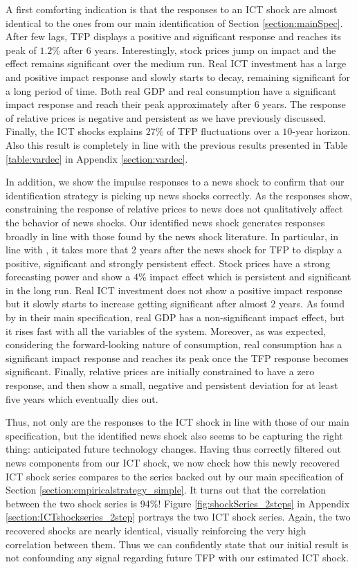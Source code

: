 \documentclass[12pt]{article}
\begin{document}
A first comforting indication is that the responses to an ICT shock are almost identical to the ones from our main identification of Section \ref{section:mainSpec}. After few lags, TFP displays a positive and significant response and reaches its peak of $1.2$\% after $6$ years. Interestingly, stock prices jump on impact and the effect remains significant over the medium run. Real ICT investment has a large and positive impact response and slowly starts to decay, remaining significant for a long period of time. Both real GDP and real consumption have a significant impact response and reach their peak approximately after $6$ years. The response of relative prices is negative and persistent as we have previously discussed. Finally, the ICT shocks explains $27$\% of TFP fluctuations over a $10$-year horizon. Also this result is completely in line with the previous results presented in Table \ref{table:vardec} in Appendix \ref{section:vardec}.

In addition, we show the impulse responses to a news shock to confirm that our identification strategy is picking up news shocks correctly. As the responses show, constraining the response of relative prices to news does not qualitatively affect the behavior of news shocks. Our identified news shock generates responses broadly in line with those found by the news shock literature. In particular, in line with \cite{barsky2011news}, it takes more that 2 years after the news shock for TFP to display a positive, significant and strongly persistent effect. Stock prices have a strong forecasting power and show a $4$\% impact effect which is persistent and significant in the long run. Real ICT investment does not show a positive impact response but it slowly starts to increase getting significant after almost $2$ years. As found by \cite{barsky2011news} in their main specification, real GDP has a non-significant impact effect, but it rises fast with all the variables of the system. Moreover, as was expected, considering the forward-looking nature of consumption, real consumption has a significant impact response and reaches its peak once the TFP response becomes significant. Finally, relative prices are initially constrained to have a zero response, and then show a small, negative and persistent deviation for at least five years which eventually dies out.

Thus, not only are the responses to the ICT shock in line with those of our main specification, but the identified news shock also seems to be capturing the right thing: anticipated future technology changes. Having thus correctly filtered out news components from our ICT shock, we now check how this newly recovered ICT shock series compares to the series backed out by our main specification of Section \ref{section:empiricalstrategy_simple}. It turns out that the correlation between the two shock series is 94\%! Figure \ref{fig:shockSeries_2steps} in Appendix \ref{section:ICTshockseries_2step} portrays the two ICT shock series. Again, the two recovered shocks are nearly identical, visually reinforcing the very high correlation between them. Thus we can confidently state that our initial result is not confounding any signal regarding future TFP with our estimated ICT shock. 
\end{document}
